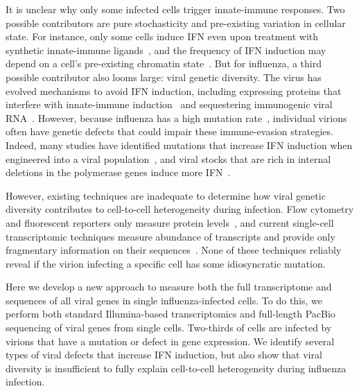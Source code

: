 \documentclass[]{asm-article}
\begin{document}
It is unclear why only some infected cells trigger innate-immune responses.
Two possible contributors are pure stochasticity and pre-existing variation in cellular state.
For instance, only some cells induce IFN even upon treatment with synthetic innate-immune ligands~\cite{shalek2013single, shalek2014single, wimmers2018single}, and the frequency of IFN induction may depend on a cell's pre-existing chromatin state~\cite{bhushal2017cell}.
But for influenza, a third possible contributor also looms large: viral genetic diversity.
The virus has evolved mechanisms to avoid IFN induction, including expressing proteins that interfere with innate-immune induction~\cite{garcia1998influenza, hale2008multifunctional,hayashi2015influenza,vreede2010mechanisms,dudek2011influenza} and sequestering immunogenic viral RNA~\cite{killip2015influenza}.
However, because influenza has a high mutation rate~\cite{parvin1986measurement, suarez1992heterogeneity, suarez1994estimation, bloom2014experimentally, pauly2017novel}, individual virions often have genetic defects that could impair these immune-evasion strategies.
Indeed, many studies have identified mutations that increase IFN induction when engineered into a viral population~\cite{killip2017single, velthuis2018mini, du2018genome, perez2014unbiased}, and viral stocks that are rich in internal deletions in the polymerase genes induce more IFN~\cite{wang2018cell, baum2010preference, tapia2013defective, boergeling2015evidence, dimmock2015cloned, liu2019inhibition}.

However, existing techniques are inadequate to determine how viral genetic diversity contributes to cell-to-cell heterogeneity during infection.
Flow cytometry and fluorescent reporters only measure protein levels~\cite{sjaastad2018distinct, brooke2013most, guo2017single}, and current single-cell transcriptomic techniques measure abundance of transcripts and provide only fragmentary information on their sequences~\cite{russell2018extreme, steuerman2018dissection, wang2018cell, zanini2018single, zanini2018virus, saikia2018simultaneous, oneal2018west}.
None of these techniques reliably reveal if the virion infecting a specific cell has some idiosyncratic mutation.

Here we develop a new approach to measure both the full transcriptome and sequences of all viral genes in single influenza-infected cells.
To do this, we perform both standard Illumina-based transcriptomics and full-length PacBio sequencing of viral genes from single cells.
Two-thirds of cells are infected by virions that have a mutation or defect in gene expression.
We identify several types of viral defects that increase IFN induction, but also show that viral diversity is insufficient to fully explain cell-to-cell heterogeneity during influenza infection.
\end{document}
